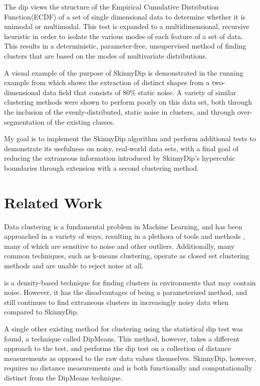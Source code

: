 \documentclass{sig-alternate-05-2015}
\begin{document}
The dip views the structure of the Empirical Cumulative Distribution Function(ECDF) of a set of single dimensional data to determine whether it is unimodal or multimodal. This test is expanded to a multidimensional, recursive heuristic in order to isolate the various modes of each feature of a set of data. This results in a deterministic, parameter-free, unsupervised method of finding clusters that are based on the modes of multivariate distributions. 

A visual example of the purpose of SkinnyDip is demonstrated in the running example from \cite{skinnydip} which shows the extraction of distinct shapes from a two-dimensional data field that consists of 80\% static noise. A variety of similar clustering methods were shown to perform poorly on this data set, both through the inclusion of the evenly-distributed, static noise in clusters, and through over-segmentation of the existing classes.

My goal is to implement the SkinnyDip algorithm and perform additional tests to demonstrate its usefulness on noisy, real-world data sets, with a final goal of reducing the extraneous information introduced by SkinnyDip's hypercubic boundaries through extension with a second clustering method.


\section{Related Work}
Data clustering is a fundamental problem in Machine Learning, and has been approached in a variety of ways, resulting in a plethora of tools and methods \cite{ClusteringMethods}, many of which are sensitive to noise and other outliers. Additionally, many common techniques, such as k-means clustering, operate as closed set clustering methods and are unable to reject noise at all.

\cite{DBSCAN} is a density-based technique for finding clusters in environments that may contain noise. However, it has the disadvantages of being a parameterized method, and still continues to find extraneous clusters in increasingly noisy data when compared to SkinnyDip.

A single other existing method for clustering using the statistical dip test was found, a technique called DipMeans\cite{dipmeans}. This method, however, takes a different approach to the test, and performs the dip test on a collection of distance measurements as opposed to the raw data values themselves. SkinnyDip, however, requires no distance measurements  and is both functionally and computationally distinct from the DipMeans technique.
\end{document}
